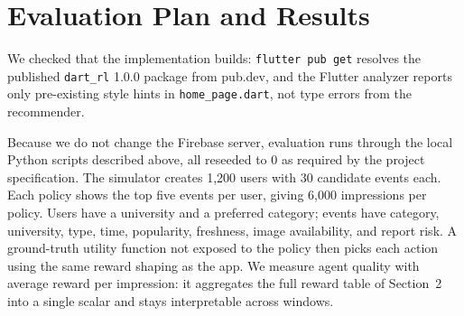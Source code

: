 \documentclass{article}
\begin{document}
\section{Evaluation Plan and Results}
We checked that the implementation builds: \texttt{flutter pub get} resolves the published \texttt{dart\_rl} 1.0.0 package from pub.dev, and the Flutter analyzer reports only pre-existing style hints in \texttt{home\_page.dart}, not type errors from the recommender.

Because we do not change the Firebase server, evaluation runs through the local Python scripts described above, all reseeded to 0 as required by the project specification. The simulator creates 1{,}200 users with 30 candidate events each. Each policy shows the top five events per user, giving 6{,}000 impressions per policy. Users have a university and a preferred category; events have category, university, type, time, popularity, freshness, image availability, and report risk. A ground-truth utility function not exposed to the policy then picks each action using the same reward shaping as the app. We measure agent quality with average reward per impression: it aggregates the full reward table of Section~2 into a single scalar and stays interpretable across windows.
\end{document}
